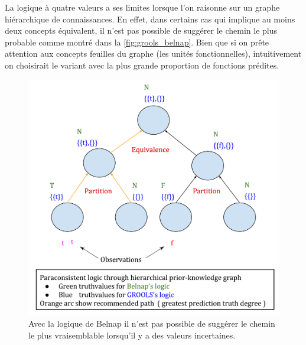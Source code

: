 \begin{refsegment}
La logique à quatre valeurs a ses limites lorsque l'on raisonne sur un graphe hiérarchique de connaissances. En effet, dans certains cas qui implique au moins deux concepts équivalent, il n'est pas possible de suggérer le chemin le plus probable comme montré dans la \cref{fig:grools_belnap}. Bien que si on prête attention aux concepts feuilles du graphe (les unités fonctionnelles), intuitivement on choisirait le variant avec la plus grande proportion de fonctions prédites.

\begin{shadedfigure}[H]
	\begin{subfigure}[t]{.48\textwidth}
		\centering
		\includegraphics[width=\textwidth]{img/GROOLS_vs_belnap_1.pdf}
		\caption{Avec la logique de Belnap il n'est pas possible de suggérer le chemin le plus vraisemblable lorsqu'il y a des valeurs incertaines.}
		\label{fig:grools_belnap_1}
	\end{subfigure}
	\hfill
	\begin{subfigure}[t]{.48\textwidth}
		\centering

\end{subfigure}
\end{shadedfigure}
\end{refsegment}
